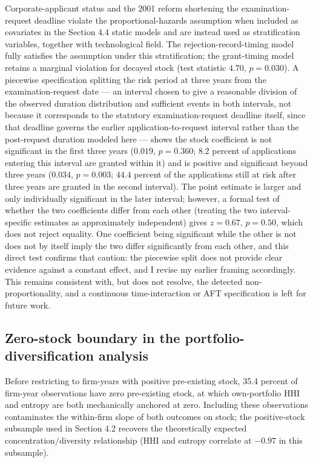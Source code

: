 \documentclass[12pt]{article}
\begin{document}
Corporate-applicant status and the 2001 reform shortening the examination-request deadline violate the proportional-hazards assumption when included as covariates in the Section 4.4 static models and are instead used as stratification variables, together with technological field. The rejection-record-timing model fully satisfies the assumption under this stratification; the grant-timing model retains a marginal violation for decayed stock (test statistic $4.70$, $p=0.030$). A piecewise specification splitting the risk period at three years from the examination-request date --- an interval chosen to give a reasonable division of the observed duration distribution and sufficient events in both intervals, not because it corresponds to the statutory examination-request deadline itself, since that deadline governs the earlier application-to-request interval rather than the post-request duration modeled here --- shows the stock coefficient is not significant in the first three years ($0.019$, $p=0.360$; $8.2$ percent of applications entering this interval are granted within it) and is positive and significant beyond three years ($0.034$, $p=0.003$; $44.4$ percent of the applications still at risk after three years are granted in the second interval). The point estimate is larger and only individually significant in the later interval; however, a formal test of whether the two coefficients differ from each other (treating the two interval-specific estimates as approximately independent) gives $z=0.67$, $p=0.50$, which does not reject equality. One coefficient being significant while the other is not does not by itself imply the two differ significantly from each other, and this direct test confirms that caution: the piecewise split does not provide clear evidence against a constant effect, and I revise my earlier framing accordingly. This remains consistent with, but does not resolve, the detected non-proportionality, and a continuous time-interaction or AFT specification is left for future work.

\subsection{Zero-stock boundary in the portfolio-diversification analysis}

Before restricting to firm-years with positive pre-existing stock, 35.4 percent of firm-year observations have zero pre-existing stock, at which own-portfolio HHI and entropy are both mechanically anchored at zero. Including these observations contaminates the within-firm slope of both outcomes on stock; the positive-stock subsample used in Section 4.2 recovers the theoretically expected concentration/diversity relationship (HHI and entropy correlate at $-0.97$ in this subsample).
\end{document}
